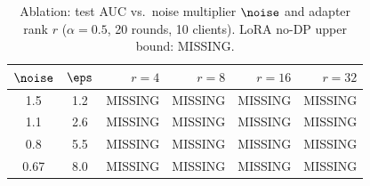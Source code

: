 \begin{table}[h]
\centering
\caption{Ablation: test AUC vs.\ noise multiplier $\noise$ and adapter rank $r$ ($\alpha{=}0.5$, 20 rounds, 10 clients). LoRA no-DP upper bound: {\color{red}MISSING}.}
\label{tab:ablation}
\begin{tabular}{ccrrrr}
\toprule
$\noise$ & $\eps$ & $r{=}4$ & $r{=}8$ & $r{=}16$ & $r{=}32$ \\
\midrule
1.5 & 1.2 & {\color{red}MISSING} & {\color{red}MISSING} & {\color{red}MISSING} & {\color{red}MISSING} \\
1.1 & 2.6 & {\color{red}MISSING} & {\color{red}MISSING} & {\color{red}MISSING} & {\color{red}MISSING} \\
0.8 & 5.5 & {\color{red}MISSING} & {\color{red}MISSING} & {\color{red}MISSING} & {\color{red}MISSING} \\
0.67 & 8.0 & {\color{red}MISSING} & {\color{red}MISSING} & {\color{red}MISSING} & {\color{red}MISSING} \\
\bottomrule
\end{tabular}
\end{table}